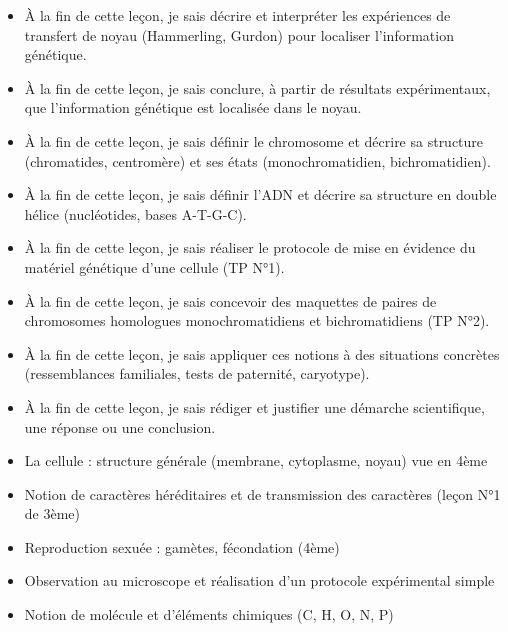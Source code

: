 \documentclass[11pt]{article}
\begin{document}
\begin{objectifs}
\begin{itemize}
\item À la fin de cette leçon, je sais décrire et interpréter les expériences de transfert de noyau (Hammerling, Gurdon) pour localiser l'information génétique.
\item À la fin de cette leçon, je sais conclure, à partir de résultats expérimentaux, que l'information génétique est localisée dans le noyau.
\item À la fin de cette leçon, je sais définir le chromosome et décrire sa structure (chromatides, centromère) et ses états (monochromatidien, bichromatidien).
\item À la fin de cette leçon, je sais définir l'ADN et décrire sa structure en double hélice (nucléotides, bases A-T-G-C).
\item À la fin de cette leçon, je sais réaliser le protocole de mise en évidence du matériel génétique d'une cellule (TP N°1).
\item À la fin de cette leçon, je sais concevoir des maquettes de paires de chromosomes homologues monochromatidiens et bichromatidiens (TP N°2).
\item À la fin de cette leçon, je sais appliquer ces notions à des situations concrètes (ressemblances familiales, tests de paternité, caryotype).
\item À la fin de cette leçon, je sais rédiger et justifier une démarche scientifique, une réponse ou une conclusion.
\end{itemize}
\end{objectifs}

\begin{prerequis}
\begin{itemize}
\item La cellule : structure générale (membrane, cytoplasme, noyau) vue en 4ème
\item Notion de caractères héréditaires et de transmission des caractères (leçon N°1 de 3ème)
\item Reproduction sexuée : gamètes, fécondation (4ème)
\item Observation au microscope et réalisation d'un protocole expérimental simple
\item Notion de molécule et d'éléments chimiques (C, H, O, N, P)
\end{itemize}
\end{prerequis}

\newpage
\end{document}
